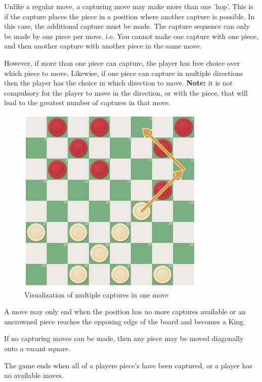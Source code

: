 \documentclass{article}
\begin{document}
    Unlike a regular move, a capturing move may make more than one 'hop'. This is if the capture places the piece in a position where another capture is possible.
    In this case, the additional capture must be made. The capture sequence can only be made by one piece per move. i.e. You cannot make one capture with one piece, 
    and then another capture with another piece in the same move.
    
    However, if more than one piece can capture, the player has free choice over which piece to move. Likewise, if one piece can capture in multiple
    directions then the player has the choice in which direction to move. \textbf{Note:} it is not compulsory for the player to move in the direction, or with the piece,
    that will lead to the greatest number of captures in that move.
    
    \begin{figure}
        \centering
        \includegraphics[scale=0.8]{double hop.png}
        \caption{Visualization of multiple captures in one move}
    \end{figure}

    A move may only end when the position has no more captures available or an uncrowned piece reaches the opposing edge
    of the board and becomes a King. 

    If no capturing moves can be made, then any piece may be moved diagonally onto a vacant square.

    The game ends when all of a players piece's have been captured, or a player has no available moves.
\end{document}
